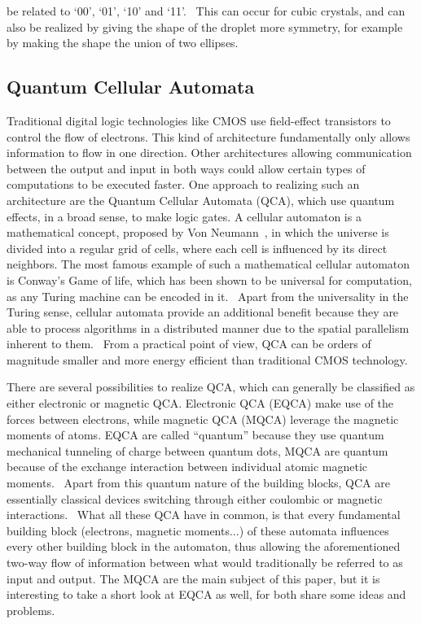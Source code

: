\documentclass[10pt,a4paper]{article}
\begin{document}
be related to `00', `01', `10' and `11'.~\cite{MQCA_ImageRecognition} This can occur for cubic crystals, and can also be realized by giving the shape of the droplet more symmetry, for example by making the shape the union of two ellipses.


\subsection{Quantum Cellular Automata}
Traditional digital logic technologies like CMOS use field-effect transistors to control the flow of electrons. This kind of architecture fundamentally only allows information to flow in one direction. Other architectures allowing communication between the output and input in both ways could allow certain types of computations to be executed faster. One approach to realizing such an architecture are the Quantum Cellular Automata (QCA), which use quantum effects, in a broad sense, to make logic gates. A cellular automaton is a mathematical concept, proposed by Von Neumann~\cite{Sideinfo_SelfRepAutomata}, in which the universe is divided into a regular grid of cells, where each cell is influenced by its direct neighbors. The most famous example of such a mathematical cellular automaton is Conway's Game of life, which has been shown to be universal for computation, as any Turing machine can be encoded in it.~\cite{QCA_GameOfLife} Apart from the universality in the Turing sense, cellular automata provide an additional benefit because they are able to process algorithms in a distributed manner due to the spatial parallelism inherent to them.~\cite{QCA_GameOfLife} From a practical point of view, QCA can be orders of magnitude smaller and more energy efficient than traditional CMOS technology.~\cite{MQCA_RoomTemp} \par
There are several possibilities to realize QCA, which can generally be classified as either electronic or magnetic QCA. Electronic QCA (EQCA) make use of the forces between electrons, while magnetic QCA (MQCA) leverage the magnetic moments of atoms. EQCA are called ``quantum'' because they use quantum mechanical tunneling of charge between quantum dots, MQCA are quantum because of the exchange interaction between individual atomic magnetic moments.~\cite{MQCA_RoomTemp} Apart from this quantum nature of the building blocks, QCA are essentially classical devices switching through either coulombic or magnetic interactions.~\cite{QCA_Algorithms} What all these QCA have in common, is that every fundamental building block (electrons, magnetic moments...) of these automata influences every other building block in the automaton, thus allowing the aforementioned two-way flow of information between what would traditionally be referred to as input and output. The MQCA are the main subject of this paper, but it is interesting to take a short look at EQCA as well, for both share some ideas and problems. \par
\end{document}
